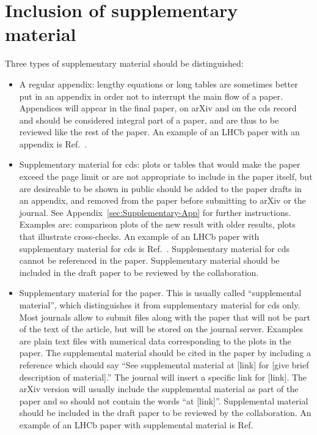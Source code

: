 \section{Inclusion of supplementary material}
\label{sec:Supplementary}

Three types of supplementary material should be distinguished:
\begin{itemize}
\item{A regular appendix: lengthy equations or long tables are sometimes
better put in an appendix in order not to interrupt the main flow of a paper.
Appendices will appear in the final paper, on arXiv
and on the cds record and should be considered integral
part of a paper, and are thus to be reviewed like the rest of the paper.
An example of an LHCb paper with an appendix is Ref.~\cite{LHCb-PAPER-2013-070}.
}
\item{Supplementary material for cds: plots or tables that 
would make the paper exceed the page limit or are
not appropriate to include in the paper itself,
but are desireable to be shown in public
should be added to the paper drafts in an appendix, and
removed from the paper before submitting to arXiv or the journal.
See Appendix~\ref{sec:Supplementary-App} for further instructions.
Examples are: comparison plots of the new result with older results,
plots that illustrate cross-checks.
An example of an LHCb paper with supplementary material for cds 
is Ref.~\cite{LHCb-PAPER-2013-035}.
Supplementary material for cds cannot be referenced in the paper.
Supplementary material should be included in the draft paper to be
reviewed by the collaboration.
}
\item{Supplementary material for the paper. This is usually called ``supplemental material'', which distinguishes it from supplementary material for cds only. Most journals allow
to submit files along with the paper that will not be part of the
text of the article, but will be stored on the journal server.
Examples are plain text files with numerical data corresponding to the plots
in the paper. 
The supplemental material should be cited in the paper by including a reference
which should say ``See supplemental material at [link] for [give brief description of material].''
The journal will insert a specific link for [link]. The arXiv version will usually include the supplemental material as part of the paper and so should not contain the words ``at [link]''.
Supplemental material should be included in the draft paper to be
reviewed by the collaboration.
An example of an LHCb paper with supplemental material 
is Ref.~\cite{LHCb-PAPER-2015-029}
}
\end{itemize}

